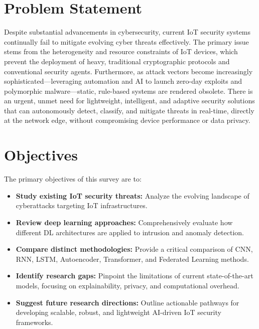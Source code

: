 \documentclass[conference]{IEEEtran}
\begin{document}
\section{Problem Statement}
Despite substantial advancements in cybersecurity, current IoT security systems continually fail to mitigate evolving cyber threats effectively. The primary issue stems from the heterogeneity and resource constraints of IoT devices, which prevent the deployment of heavy, traditional cryptographic protocols and conventional security agents. Furthermore, as attack vectors become increasingly sophisticated—leveraging automation and AI to launch zero-day exploits and polymorphic malware—static, rule-based systems are rendered obsolete. There is an urgent, unmet need for lightweight, intelligent, and adaptive security solutions that can autonomously detect, classify, and mitigate threats in real-time, directly at the network edge, without compromising device performance or data privacy.

\section{Objectives}
The primary objectives of this survey are to:
\begin{itemize}
    \item \textbf{Study existing IoT security threats:} Analyze the evolving landscape of cyberattacks targeting IoT infrastructures.
    \item \textbf{Review deep learning approaches:} Comprehensively evaluate how different DL architectures are applied to intrusion and anomaly detection.
    \item \textbf{Compare distinct methodologies:} Provide a critical comparison of CNN, RNN, LSTM, Autoencoder, Transformer, and Federated Learning methods.
    \item \textbf{Identify research gaps:} Pinpoint the limitations of current state-of-the-art models, focusing on explainability, privacy, and computational overhead.
    \item \textbf{Suggest future research directions:} Outline actionable pathways for developing scalable, robust, and lightweight AI-driven IoT security frameworks.
\end{itemize}
\end{document}

